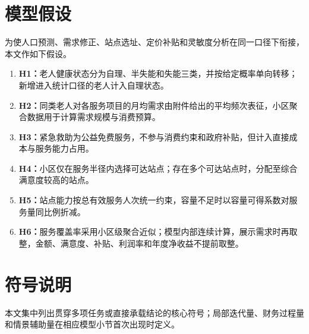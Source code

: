 \section{模型假设}

为使人口预测、需求修正、站点选址、定价补贴和灵敏度分析在同一口径下衔接，本文作如下假设。

\begin{enumerate}
  \item \textbf{H1：}老人健康状态分为自理、半失能和失能三类，并按给定概率单向转移；新增进入统计口径的老人计入自理状态。
  \item \textbf{H2：}同类老人对各服务项目的月均需求由附件给出的平均频次表征，小区聚合数据用于计算需求规模与消费预算。
  \item \textbf{H3：}紧急救助为公益免费服务，不参与消费约束和政府补贴，但计入直接成本与服务能力占用。
  \item \textbf{H4：}小区仅在服务半径内选择可达站点；存在多个可达站点时，分配至综合满意度较高的站点。
  \item \textbf{H5：}站点能力按总有效服务人次统一约束，容量不足时以容量可得系数对服务量同比例折减。
  \item \textbf{H6：}服务覆盖率采用小区级聚合近似；模型内部连续计算，展示需求时再取整，金额、满意度、补贴、利润率和年度净收益不提前取整。
\end{enumerate}

\section{符号说明}

本文集中列出贯穿多项任务或直接承载结论的核心符号；局部迭代量、财务过程量和情景辅助量在相应模型小节首次出现时定义。

